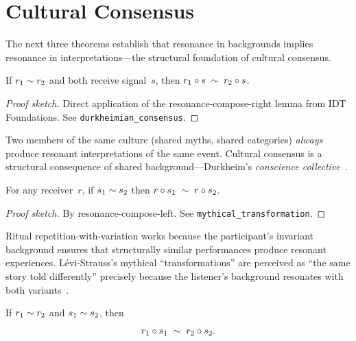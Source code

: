 \section{Cultural Consensus}
\label{sec:ch1:consensus}

The next three theorems establish that resonance in backgrounds implies
resonance in interpretations---the structural foundation of cultural
consensus.

\begin{theorem}
\label{thm:durkheimian-consensus}
If $r_1 \sim r_2$ and both receive signal~$s$, then
$r_1 \circ s \;\sim\; r_2 \circ s$.
\end{theorem}

\begin{proof}[Proof sketch]
Direct application of the resonance-compose-right lemma from IDT
Foundations.  See \texttt{durkheimian\_consensus}.
\end{proof}

\begin{remark}
Two members of the same culture (shared myths, shared categories)
\emph{always} produce resonant interpretations of the same event.
Cultural consensus is a structural consequence of shared
background---Durkheim's \emph{conscience collective}~\cite{durkheim1893}.
\end{remark}

\begin{theorem}
\label{thm:mythical-transformation}
For any receiver~$r$, if $s_1 \sim s_2$ then
$r \circ s_1 \;\sim\; r \circ s_2$.
\end{theorem}

\begin{proof}[Proof sketch]
By resonance-compose-left.  See \texttt{mythical\_transformation}.
\end{proof}

\begin{remark}
Ritual repetition-with-variation works because the participant's
invariant background ensures that structurally similar performances
produce resonant experiences.  L\'evi-Strauss's mythical
``transformations'' are perceived as ``the same story told differently''
precisely because the listener's background resonates with both
variants~\cite{levistrauss1962}.
\end{remark}

\begin{theorem}
\label{thm:turners-communitas}
If $r_1 \sim r_2$ and $s_1 \sim s_2$, then
\[
  r_1 \circ s_1 \;\sim\; r_2 \circ s_2.
\]
\end{theorem}

